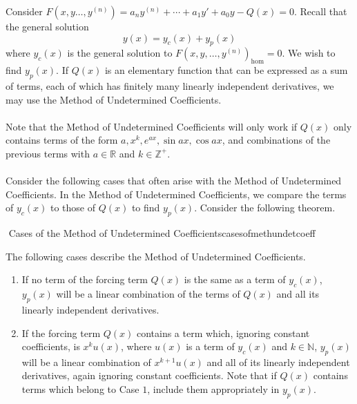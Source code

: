         Consider \(F(x,y\ldots,y^{(n)})=a_ny^{(n)}+\cdots+a_1y'+a_0y-Q(x)=0\). Recall that the general solution 
        \begin{equation*}
            y(x)=y_c(x)+y_p(x)
        \end{equation*}
        where \(y_c(x)\) is the general solution to \(F(x,y,\ldots,y^{(n)})_{\text{hom}}=0\). We wish to find \(y_p(x)\). If \(Q(x)\) is an elementary function that can be expressed as a sum of terms, each of which has finitely many linearly independent derivatives, we may use the Method of Undetermined Coefficients.
        \\
        \\
        Note that the Method of Undetermined Coefficients will only work if \(Q(x)\) only contains terms of the form \(a,x^k,e^{ax},\sin ax,\cos ax\), and combinations of the previous terms with \(a\in\mathbb{R}\) and \(k\in\mathbb{Z}^+\).
        \\
        \\
        Consider the following cases that often arise with the Method of Undetermined Coefficients. In the Method of Undetermined Coefficients, we compare the terms of \(y_c(x)\) to those of \(Q(x)\) to find \(y_p(x)\). Consider the following theorem.
        \begin{theorem}{\Stop\,\,Cases of the Method of Undetermined Coefficients}{casesofmethundetcoeff}
            
            The following cases describe the Method of Undetermined Coefficients.
            \begin{enumerate}
                \item If no term of the forcing term \(Q(x)\) is the same as a term of \(y_c(x)\), \(y_p(x)\) will be a linear combination of the terms of \(Q(x)\) and all its linearly independent derivatives.
                \item If the forcing term \(Q(x)\) contains a term which, ignoring constant coefficients, is \(x^ku(x)\), where \(u(x)\) is a term of \(y_c(x)\) and \(k\in\mathbb{N}\), \(y_p(x)\) will be a linear combination of \(x^{k+1}u(x)\) and all of its linearly independent derivatives, again ignoring constant coefficients. Note that if \(Q(x)\) contains terms which belong to Case \(1\), include them appropriately in \(y_p(x)\).
            \end{enumerate}
            
        \end{theorem}
        \pagebreak
        \vphantom
        \\
